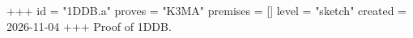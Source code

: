 +++
id = "1DDB.a"
proves = "K3MA"
premises = []
level = "sketch"
created = 2026-11-04
+++
Proof of 1DDB.
